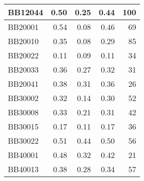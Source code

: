 \begin{table}[htbp]
\begin{tabular}{|l|r|r|r||r|}
		\hline
		BB12044 & \cellcolor[rgb]{ .988,  1,  .992}0.50 & \cellcolor[rgb]{ .384,  .745,  .478}0.25 & \cellcolor[rgb]{ .847,  .941,  .871}0.44 & \cellcolor[rgb]{ .973,  .412,  .42}100 \\
		\hline
		BB20001 & \cellcolor[rgb]{ .988,  1,  .992}0.54 & \cellcolor[rgb]{ .384,  .745,  .478}0.08 & \cellcolor[rgb]{ .886,  .957,  .906}0.46 & \cellcolor[rgb]{ .98,  .596,  .604}69 \\
		\hline
		BB20010 & \cellcolor[rgb]{ .988,  1,  .992}0.35 & \cellcolor[rgb]{ .384,  .745,  .478}0.08 & \cellcolor[rgb]{ .863,  .945,  .886}0.29 & \cellcolor[rgb]{ .976,  .502,  .51}85 \\
		\hline
		BB20022 & \cellcolor[rgb]{ .988,  1,  .992}0.11 & \cellcolor[rgb]{ .384,  .745,  .478}0.09 & \cellcolor[rgb]{ .969,  .992,  .976}0.11 & \cellcolor[rgb]{ .984,  .804,  .812}34 \\
		\hline
		BB20033 & \cellcolor[rgb]{ .988,  1,  .992}0.36 & \cellcolor[rgb]{ .384,  .745,  .478}0.27 & \cellcolor[rgb]{ .737,  .894,  .78}0.32 & \cellcolor[rgb]{ .984,  .82,  .831}31 \\
		\hline
		BB20041 & \cellcolor[rgb]{ .988,  1,  .992}0.38 & \cellcolor[rgb]{ .384,  .745,  .478}0.31 & \cellcolor[rgb]{ .839,  .937,  .867}0.36 & \cellcolor[rgb]{ .988,  .847,  .859}26 \\
		\hline
		BB30002 & \cellcolor[rgb]{ .988,  1,  .992}0.32 & \cellcolor[rgb]{ .384,  .745,  .478}0.14 & \cellcolor[rgb]{ .902,  .961,  .918}0.30 & \cellcolor[rgb]{ .98,  .694,  .706}52 \\
		\hline
		BB30008 & \cellcolor[rgb]{ .988,  1,  .992}0.33 & \cellcolor[rgb]{ .384,  .745,  .478}0.21 & \cellcolor[rgb]{ .859,  .945,  .882}0.31 & \cellcolor[rgb]{ .984,  .753,  .765}42 \\
		\hline
		BB30015 & \cellcolor[rgb]{ .988,  1,  .992}0.17 & \cellcolor[rgb]{ .384,  .745,  .478}0.11 & \cellcolor[rgb]{ .969,  .992,  .976}0.17 & \cellcolor[rgb]{ .984,  .788,  .8}36 \\
		\hline
		BB30022 & \cellcolor[rgb]{ .988,  1,  .992}0.51 & \cellcolor[rgb]{ .384,  .745,  .478}0.44 & \cellcolor[rgb]{ .91,  .965,  .925}0.50 & \cellcolor[rgb]{ .98,  .675,  .682}56 \\
		\hline
		BB40001 & \cellcolor[rgb]{ .988,  1,  .992}0.48 & \cellcolor[rgb]{ .384,  .745,  .478}0.32 & \cellcolor[rgb]{ .776,  .91,  .812}0.42 & \cellcolor[rgb]{ .988,  .878,  .89}21 \\
		\hline
		BB40013 & \cellcolor[rgb]{ .988,  1,  .992}0.38 & \cellcolor[rgb]{ .384,  .745,  .478}0.28 & \cellcolor[rgb]{ .765,  .906,  .8}0.34 & \cellcolor[rgb]{ .98,  .667,  .675}57 \\

\end{tabular}
\end{table}
